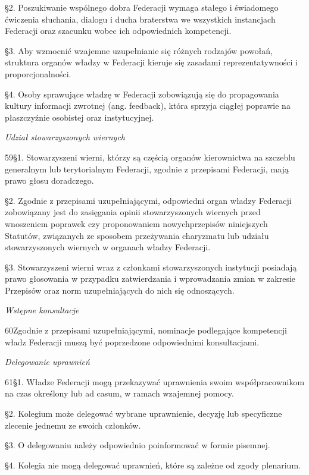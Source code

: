 ﻿\documentclass{book}
\newcommand{\lett}[1]{\lettrine[findent=6pt]{#1}}
\newcommand{\ssec}[1]{\vspace{1em}\textit{#1}\vspace{.5em}\nopagebreak}
\begin{document}
\S{}2. Poszukiwanie wspólnego dobra Federacji wymaga stałego i świadomego ćwiczenia słuchania, dialogu i ducha braterstwa we wszystkich instancjach Federacji oraz szacunku wobec ich odpowiednich kompetencji.


\S{}3. Aby wzmocnić wzajemne uzupełnianie się różnych rodzajów powołań, struktura organów władzy w Federacji kieruje się zasadami reprezentatywności i proporcjonalności.


\S{}4. Osoby sprawujące władzę w Federacji zobowiązują się do propagowania kultury informacji zwrotnej (ang. feedback), która sprzyja ciągłej poprawie na płaszczyźnie osobistej oraz instytucyjnej.
 


\ssec{Udział stowarzyszonych wiernych}


\lett{59} \S{}1. Stowarzyszeni wierni, którzy są częścią organów kierownictwa na szczeblu generalnym lub terytorialnym Federacji, zgodnie z przepisami Federacji, mają prawo głosu doradczego.


\S{}2. Zgodnie z przepisami uzupełniającymi, odpowiedni organ władzy Federacji zobowiązany jest do zasięgania opinii stowarzyszonych wiernych przed wnoszeniem poprawek czy proponowaniem nowychprzepisów niniejszych Statutów, związanych ze sposobem przeżywania charyzmatu lub udziału stowarzyszonych wiernych w organach władzy Federacji.


\S{}3. Stowarzyszeni wierni wraz z członkami stowarzyszonych instytucji posiadają prawo głosowania w przypadku zatwierdzania i wprowadzania zmian w zakresie Przepisów oraz norm uzupełniających do nich się odnoszących.
 
\ssec{Wstępne konsultacje}


\lett{60} Zgodnie z przepisami uzupełniającymi, nominacje podlegające kompetencji władz Federacji muszą być poprzedzone odpowiednimi konsultacjami.
 
\ssec{Delegowanie uprawnień}


\lett{61} \S{}1. Władze Federacji mogą przekazywać uprawnienia swoim współpracownikom na czas określony lub ad casum, w ramach wzajemnej pomocy.


\S{}2. Kolegium może delegować wybrane uprawnienie, decyzję lub specyficzne zlecenie jednemu ze swoich członków.


\S{}3. O delegowaniu należy odpowiednio poinformować w formie pisemnej.


\S{}4. Kolegia nie mogą delegować uprawnień, które są zależne od zgody plenarium.
 
\end{document}
